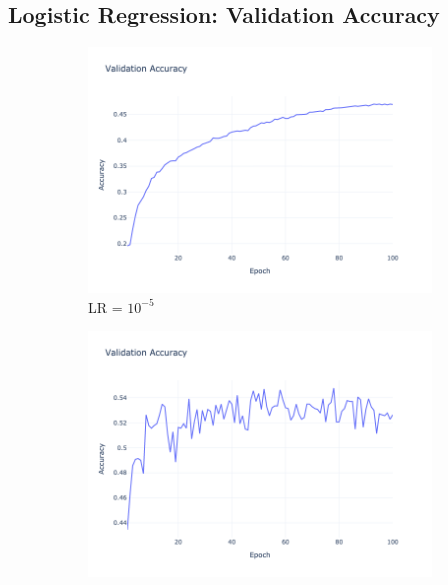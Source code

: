 \subsection{Logistic Regression: Validation Accuracy}
\begin{figure}[htbp!]
    \centering
    \begin{subfigure}{0.32\textwidth}
        \centering
        \includegraphics[width=\textwidth]{images/logistic_regression-validation-accuracy-batch-32-lr-1e-05-epochs-100-l2-0.01-opt-sgd.png}
        \caption{LR = $10^{-5}$}
    \end{subfigure}
    \begin{subfigure}{0.32\textwidth}
        \centering
        \includegraphics[width=\textwidth]{images/logistic_regression-validation-accuracy-batch-32-lr-0.001-epochs-100-l2-0.01-opt-sgd.png}

\end{subfigure}
\end{figure}
